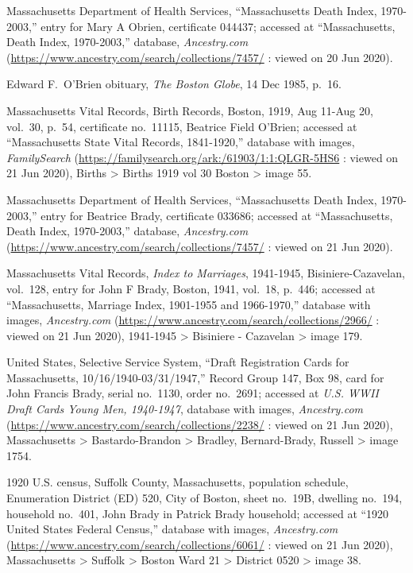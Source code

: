 \begin{thebibliography}{999}
Massachusetts Department of Health Services, ``Massachusetts Death Index, 1970-2003,'' entry for Mary A Obrien, certificate 044437; accessed at ``Massachusetts, Death Index, 1970-2003,'' database, \textit{Ancestry.com} (\url{https://www.ancestry.com/search/collections/7457/} : viewed on 20 Jun 2020).

Edward F.\ O'Brien obituary, \textit{The Boston Globe}, 14 Dec 1985, p.\ 16.


Massachusetts Vital Records, Birth Records, Boston, 1919, Aug 11-Aug 20, vol.\ 30, p.\ 54, certificate no.\ 11115, Beatrice Field O'Brien; accessed at ``Massachusetts State Vital Records, 1841-1920,'' database with images, \textit{FamilySearch} (\url{https://familysearch.org/ark:/61903/1:1:QLGR-5HS6} : viewed on 21 Jun 2020), Births > Births 1919 vol 30 Boston > image 55.

Massachusetts Department of Health Services, ``Massachusetts Death Index, 1970-2003,'' entry for Beatrice Brady, certificate 033686; accessed at ``Massachusetts, Death Index, 1970-2003,'' database, \textit{Ancestry.com} (\url{https://www.ancestry.com/search/collections/7457/} : viewed on 21 Jun 2020).

Massachusetts Vital Records, \textit{Index to Marriages}, 1941-1945, Bisiniere-Cazavelan, vol.\ 128, entry for John F Brady, Boston, 1941, vol.\ 18, p.\ 446; accessed at ``Massachusetts, Marriage Index, 1901-1955 and 1966-1970,'' database with images, \textit{Ancestry.com} (\url{https://www.ancestry.com/search/collections/2966/} : viewed on 21 Jun 2020), 1941-1945 > Bisiniere - Cazavelan > image 179.

United States, Selective Service System, ``Draft Registration Cards for Massachusetts, 10/16/1940-03/31/1947,'' Record Group 147, Box 98, card for John Francis Brady, serial no.\ 1130, order no.\ 2691; accessed at \textit{U.S. WWII Draft Cards Young Men, 1940-1947}, database with images, \textit{Ancestry.com} (\url{https://www.ancestry.com/search/collections/2238/} : viewed on 21 Jun 2020), Massachusetts >  Bastardo-Brandon > Bradley, Bernard-Brady, Russell > image 1754.

1920 U.S. census, Suffolk County, Massachusetts, population schedule, Enumeration District (ED) 520, City of Boston, sheet no.\ 19B, dwelling no.\ 194, household no.\ 401, John Brady in Patrick Brady household; accessed at ``1920 United States Federal Census,'' database with images, \textit{Ancestry.com} (\url{https://www.ancestry.com/search/collections/6061/} : viewed on 21 Jun 2020), Massachusetts > Suffolk > Boston Ward 21 > District 0520 > image 38.


\end{thebibliography}
